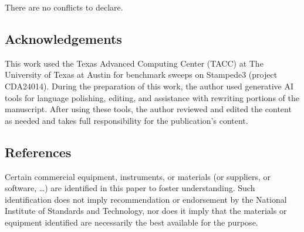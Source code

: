 \documentclass[
]{article}
\begin{document}
There are no conflicts to declare.

\hypertarget{acknowledgements}{%
\subsection{Acknowledgements}\label{acknowledgements}}

This work used the Texas Advanced Computing Center (TACC) at The
University of Texas at Austin for benchmark sweeps on Stampede3 (project
CDA24014). During the preparation of this work, the author used
generative AI tools for language polishing, editing, and assistance with
rewriting portions of the manuscript. After using these tools, the
author reviewed and edited the content as needed and takes full
responsibility for the publication's content.

\hypertarget{references}{%
\subsection{References}\label{references}}

Certain commercial equipment, instruments, or materials (or suppliers,
or software, \ldots) are identified in this paper to foster
understanding. Such identification does not imply recommendation or
endorsement by the National Institute of Standards and Technology, nor
does it imply that the materials or equipment identified are necessarily
the best available for the purpose.
\end{document}

